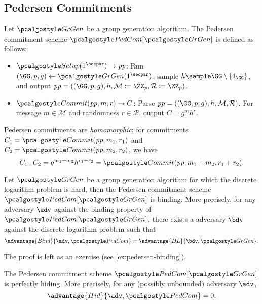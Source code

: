 \subsection{Pedersen Commitments}

\begin{definition}
  Let $\grgen$ be a group generation algorithm.
  The Pedersen commitment scheme $\algo{PedCom}[\grgen]$ is defined as follows:
  \begin{itemize}
  \item $\algo{Setup}(1^\secpar) \rightarrow \params$: Run $\gparam \gets \grgen(1^\secpar)$, sample $h \sample \GG \setminus \{1_\GG\}$, and output $\params = (\gparam, h, \mathcal{M} \defeq \ZZ_p, \mathcal{R} \defeq \ZZ_p)$.
  \item $\algo{Commit}(\params, m, r) \rightarrow C$: Parse $\params = ((\GG, p, g), h, \mathcal{M}, \mathcal{R})$. For message $m \in \mathcal{M}$ and randomness $r \in \mathcal{R}$, output $C = g^m h^r$.
  \end{itemize}
\end{definition}

\begin{remark}
  Pedersen commitments are \emph{homomorphic}: for commitments $C_1 = \algo{Commit}(\params, m_1, r_1)$ and $C_2 = \algo{Commit}(\params, m_2, r_2)$, we have
  \[
  C_1 \cdot C_2 = g^{m_1 + m_2} h^{r_1 + r_2} = \algo{Commit}(\params, m_1 + m_2, r_1 + r_2).
  \]
\end{remark}

\begin{theorem}\label{thm:pedersen-binding}
  Let $\grgen$ be a group generation algorithm for which the discrete logarithm problem is hard, then the Pedersen commitment scheme $\algo{PedCom}[\grgen]$ is binding.
  More precisely, for any \ppt adversary $\adv$ against the binding property of $\algo{PedCom}[\grgen]$, there exists a \ppt adversary $\bdv$ against the discrete logarithm problem such that
  \[
  \advantage{Bind}{\adv, \algo{PedCom}} = \advantage{DL}{\bdv, \grgen}.
  \]
\end{theorem}

The proof is left as an exercise (see \autoref{ex:pedersen-binding}).

\begin{theorem}\label{thm:pedersen-hiding}
  The Pedersen commitment scheme $\algo{PedCom}[\grgen]$ is perfectly hiding.
  More precisely, for any (possibly unbounded) adversary $\adv$,
  \[
  \advantage{Hid}{\adv, \algo{PedCom}} = 0.
  \]
\end{theorem}

